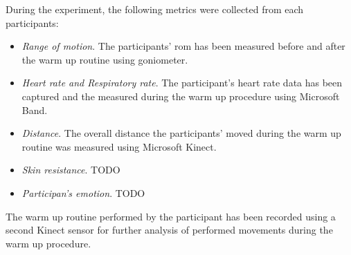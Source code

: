 During the experiment, the following metrics were collected from each participants:
\begin{itemize}
\item \textit{Range of motion}. The participants' \acrshort{rom} has been measured before and after the warm up routine using goniometer.
\item \textit{Heart rate and Respiratory rate}. The participant's heart rate data has been captured and the measured during the warm up procedure using Microsoft Band.
\item \textit{Distance}. The overall distance the participants' moved during the warm up routine was measured using Microsoft Kinect. 
\item \textit{Skin resistance}. TODO
\item \textit{Participan's emotion}. TODO
\end{itemize}
The warm up routine performed by the participant has been recorded using a second Kinect sensor for further analysis of performed movements during the warm up procedure.

